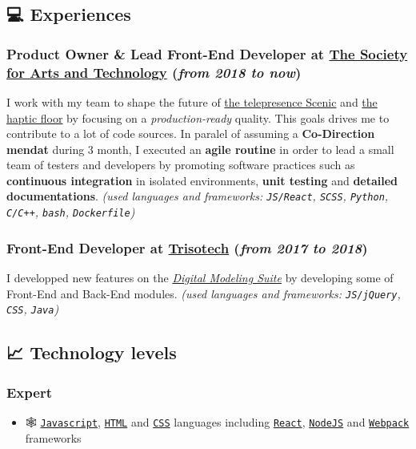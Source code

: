 \documentclass[11pt]{article}
\begin{document}
\subsection{💻 Experiences}
\label{sec:orga41bb50}
\subsubsection{\textbf{Product Owner \& Lead Front-End Developer} at \href{https://sat.qc.ca/}{The Society for Arts and Technology} (\emph{from 2018 to now})}
\label{sec:orgcd3f743}
I work with my team to shape the future of \href{https://gitlab.com/sat-mtl/tools/scenic/scenic}{the telepresence Scenic} and \href{https://gitlab.com/sat-mtl/tools/haptic-floor}{the haptic floor} by focusing on a \emph{production-ready} quality. This goals drives me to contribute to a lot of code sources. In paralel of assuming a \textbf{Co-Direction mendat} during 3 month, I executed an \textbf{agile routine} in order to lead a small team of testers and developers by promoting software practices such as \textbf{continuous integration} in isolated environments, \textbf{unit testing} and \textbf{detailed documentations}.
\emph{(used languages and frameworks: \texttt{JS/React}, \texttt{SCSS}, \texttt{Python}, \texttt{C/C++}, \texttt{bash}, \texttt{Dockerfile})}

\subsubsection{\textbf{Front-End Developer} at \href{https://www.trisotech.com/}{Trisotech} (\emph{from 2017 to 2018})}
\label{sec:orgff35975}
I developped new features on the \emph{\href{https://www.trisotech.com/digital-modeling-suite/}{Digital Modeling Suite}} by developing some of Front-End and Back-End modules.
\emph{(used languages and frameworks: \texttt{JS/jQuery}, \texttt{CSS}, \texttt{Java})}

\subsection{📈 Technology levels}
\label{sec:org1a7758b}
\subsubsection{Expert}
\label{sec:org9d61901}
\begin{itemize}
\item 🕸 \href{https://www.javascript.com/}{\texttt{Javascript}}, \href{https://html.spec.whatwg.org/multipage/}{\texttt{HTML}} and \href{https://www.w3.org/Style/CSS/}{\texttt{CSS}} languages including \href{https://reactjs.org/}{\texttt{React}}, \href{https://nodejs.org}{\texttt{NodeJS}} and \href{https://webpack.js.org/}{\texttt{Webpack}} frameworks
\end{itemize}
\end{document}
